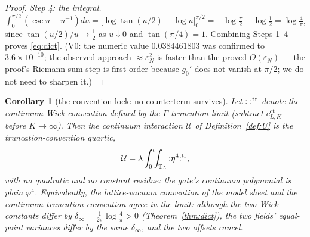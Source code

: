 \documentclass[11pt,a4paper]{article}
\theoremstyle{plain}
\newtheorem{corollary}[theorem]{Corollary}
\theoremstyle{definition}
\newcommand{\T}{\mathbb{T}}
\newcommand{\eps}{\varepsilon}
\newcommand{\U}{\mathcal U}
\begin{document}
\begin{proof}
\emph{Step 4: the integral.} $\int_0^{\pi/2}(\csc u-u^{-1})du
=\bigl[\log\tan(u/2)-\log u\bigr]_0^{\pi/2}
=-\log\tfrac\pi2-\log\tfrac12=\log\tfrac4\pi$, since
$\tan(u/2)/u\to\tfrac12$ as $u\downarrow0$ and $\tan(\pi/4)=1$. Combining
Steps 1--4 proves \eqref{eq:dict}. (V0: the numeric value
$0.0384461803$ was confirmed to $3.6\times10^{-10}$; the observed
approach $\approx\eps_N^2$ is faster than the proved $O(\eps_N)$ --- the
proof's Riemann-sum step is first-order because $g_0'$ does not vanish at
$\pi/2$; we do not need to sharpen it.)
\end{proof}

\begin{corollary}[the convention lock: no counterterm survives]
\label{cor:lock}
Let ${:}\;{:}^{\rm tr}$ denote the continuum Wick convention defined by the
$\Gamma$-truncation limit (subtract $c^{\mathrm{ct}}_{L,K}$ before
$K\to\infty$). Then the continuum interaction $\U$ of Definition~\ref{def:U}
\emph{is} the truncation-convention quartic,
\[
 \U=\lambda\int_0^t\!\!\int_{\T_L}{:}\eta^4{:}^{\rm tr},
\]
with \emph{no} quadratic and no constant residue: the gate's continuum
polynomial is plain $\varphi^4$. Equivalently, the lattice-vacuum convention
of the model sheet and the continuum truncation convention \emph{agree in the
limit}: although the two Wick constants differ by
$\delta_\infty=\tfrac1{2\pi}\log\tfrac4\pi>0$ (Theorem~\ref{thm:dict}), the
two fields' equal-point variances differ by the same $\delta_\infty$, and the
two offsets cancel.
\end{corollary}
\end{document}

